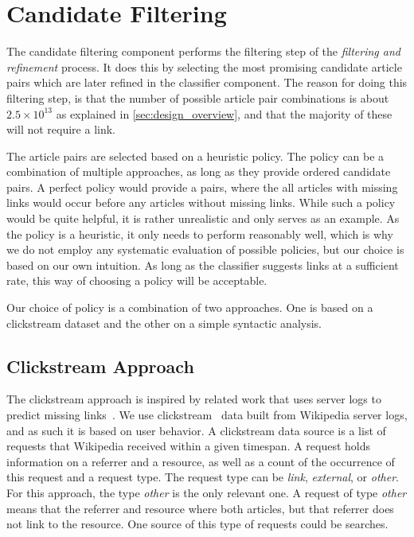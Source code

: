 \section{Candidate Filtering}
The candidate filtering component performs the filtering step of the \emph{filtering and refinement} process. It does this by selecting the most promising candidate article pairs which are later refined in the classifier component. The reason for doing this filtering step, is that the number of possible article pair combinations is about $2.5 \times 10^{13}$ as explained in \cref{sec:design_overview}, and that the majority of these will not require a link.

The article pairs are selected based on a heuristic policy. The policy can be a combination of multiple approaches, as long as they provide ordered candidate pairs. A perfect policy would provide a pairs, where the all articles with missing links would occur before any articles without missing links. While such a policy would be quite helpful, it is rather unrealistic and only serves as an example. As the policy is a heuristic, it only needs to perform reasonably well, which is why we do not employ any systematic evaluation of possible policies, but our choice is based on our own intuition. As long as the classifier suggests links at a sufficient rate, this way of choosing a policy will be acceptable.

Our choice of policy is a combination of two approaches. One is based on a clickstream dataset and the other on a simple syntactic analysis.

\subsection{Clickstream Approach}

The clickstream approach is inspired by related work that uses server logs to predict missing links~\cite{hyperlink-structure-using-logs}. We use clickstream~\cite{wiki-clickstream} data built from Wikipedia server logs, and as such it is based on user behavior. A clickstream data source is a list of requests that Wikipedia received within a given timespan. A request holds information on a referrer and a resource, as well as a count of the occurrence of this request and a request type. The request type can be \emph{link}, \emph{external}, or \emph{other}. For this approach, the type \emph{other} is the only relevant one. A request of type \emph{other} means that the referrer and resource where both articles, but that referrer does not link to the resource. One source of this type of requests could be searches.

